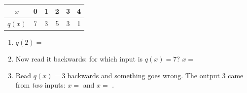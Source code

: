 \documentclass[10pt]{article}
\begin{document}
\begin{enumerate}[itemsep=12pt]
\smallskip
\renewcommand{\arraystretch}{1.4}
\begin{tabular}{|c|c|c|c|c|c|}
\hline
$x$ & 0 & 1 & 2 & 3 & 4 \\
\hline
$q(x)$ & 7 & 3 & 5 & 3 & 1 \\
\hline
\end{tabular}
\smallskip

\begin{enumerate}[label=(\alph*), itemsep=5pt]
  \item $q(2) = $ \blank{2cm}
  \item Now read it backwards: for which input is $q(x) = 7$?
        \quad $x = $ \blank{2cm}
  \item Read $q(x) = 3$ backwards and something goes wrong. The output 3 came
        from \textit{two} inputs: $x = $ \blank{1.4cm} and $x = $
        \blank{1.4cm}.
\end{enumerate}

\end{enumerate}
\end{document}
